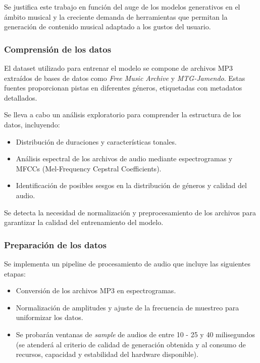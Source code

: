 Se justifica este trabajo en función del auge de los modelos generativos en el ámbito musical y la creciente demanda de herramientas que permitan la generación de contenido musical adaptado a los gustos del usuario.

\subsubsection{Comprensión de los datos}

El dataset utilizado para entrenar el modelo se compone de archivos MP3 extraídos de bases de datos como \textit{Free Music Archive} y \textit{MTG-Jamendo}. Estas fuentes proporcionan pistas en diferentes géneros, etiquetadas con metadatos detallados.

Se lleva a cabo un análisis exploratorio para comprender la estructura de los datos, incluyendo:
\begin{itemize}
    \item Distribución de duraciones y características tonales.
    \item Análisis espectral de los archivos de audio mediante espectrogramas y MFCCs (Mel-Frequency Cepstral Coefficients).
    \item Identificación de posibles sesgos en la distribución de géneros y calidad del audio.
\end{itemize}

Se detecta la necesidad de normalización y preprocesamiento de los archivos para garantizar la calidad del entrenamiento del modelo.

\subsubsection{Preparación de los datos}

Se implementa un pipeline de procesamiento de audio que incluye las siguientes etapas:
\begin{itemize}
    \item Conversión de los archivos MP3 en espectrogramas.
    \item Normalización de amplitudes y ajuste de la frecuencia de muestreo para uniformizar los datos.
    \item Se probarán ventanas de \emph{sample} de audios de entre 10 - 25 y 40 milisegundos (se atenderá al criterio de calidad de generación obtenida y al consumo de recursos, capacidad y estabilidad del hardware disponible).
\end{itemize}

